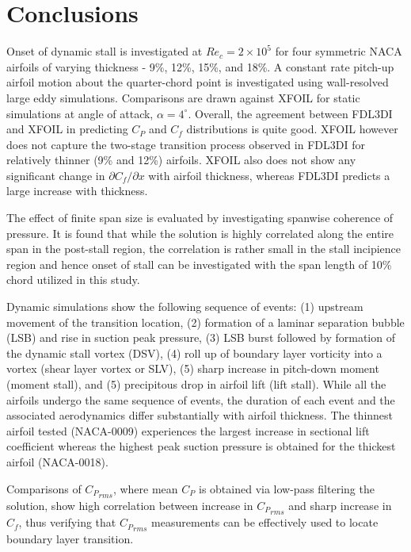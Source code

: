 \documentclass[aps,pra,preprint,groupedaddress]{revtex4-1}
\renewcommand{\=}[1]{\stackrel{#1}{=}} %
\begin{document}
\section{Conclusions}
\label{sec:conclusions}
Onset of dynamic stall is investigated at $Re_c=2\times10^5$ for four symmetric
NACA airfoils of varying thickness -  9\%, 12\%, 15\%, and 18\%. A constant
rate pitch-up airfoil motion about the quarter-chord point is investigated
using wall-resolved large eddy simulations. Comparisons are drawn against XFOIL
for static simulations at angle of attack, $\alpha=4^\circ$. Overall, the
agreement between FDL3DI and XFOIL in predicting $C_P$ and $C_f$ distributions
is quite good. XFOIL however does not capture the two-stage transition process
observed in FDL3DI for relatively thinner (9\% and 12\%) airfoils. XFOIL also
does not show any significant change in $\partial C_f/\partial x$ with airfoil
thickness, whereas FDL3DI predicts a large increase with thickness.

The effect of finite span size is evaluated by investigating spanwise coherence
of pressure. It is found that while the solution is highly correlated along the
entire span in the post-stall region, the correlation is rather small in the
stall incipience region and hence onset of stall can be investigated with the
span length of 10\% chord utilized in this study.

Dynamic simulations show the following sequence of events: (1) upstream
movement of the transition location, (2) formation of a laminar separation
bubble (LSB) and rise in suction peak pressure, (3) LSB burst followed by
formation of the dynamic stall vortex (DSV), (4) roll up of boundary layer
vorticity into a vortex (shear layer vortex or SLV), (5) sharp increase in
pitch-down moment (moment stall), and (5) precipitous drop in airfoil lift
(lift stall). While all the airfoils undergo the same sequence of events, the
duration of each event and the associated aerodynamics differ substantially
with airfoil thickness. The thinnest airfoil tested (NACA-0009) experiences the
largest increase in sectional lift coefficient whereas the highest peak suction
pressure is obtained for the thickest airfoil (NACA-0018). 

Comparisons of ${C_P}_{rms}$, where mean $C_P$ is obtained via low-pass
filtering the solution, show high correlation between increase in ${C_P}_{rms}$
and sharp increase in $C_f$, thus verifying that ${C_P}_{rms}$ measurements can
be effectively used to locate boundary layer transition.
\end{document}
